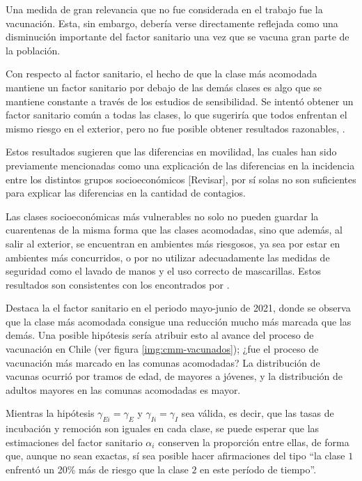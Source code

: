 Una medida de gran relevancia que no fue considerada en el trabajo fue la vacunación. Esta, sin embargo, debería verse directamente reflejada como una disminución importante del factor sanitario una vez que se vacuna gran parte de la población.

Con respecto al factor sanitario, el hecho de que la clase más acomodada mantiene un factor sanitario por debajo de las demás clases es algo que se mantiene constante a través de los estudios de sensibilidad. Se intentó obtener un factor sanitario común a todas las clases, lo que sugeriría que todos enfrentan el mismo riesgo en el exterior, pero no fue posible obtener resultados razonables, .

Estos resultados sugieren que las diferencias en movilidad, las cuales han sido previamente mencionadas como una explicación de las diferencias en la incidencia entre los distintos grupos socioeconómicos \cite{Mena2021}\cite{Gozzi2021} [Revisar], por sí solas no son suficientes para explicar las diferencias en la cantidad de contagios.

Las clases socioeconómicas más vulnerables no solo no pueden guardar la cuarentenas de la misma forma que las clases acomodadas, sino que además, al salir al exterior, se encuentran en ambientes más riesgosos, ya sea por estar en ambientes más concurridos, o por no utilizar adecuadamente las medidas de seguridad como el lavado de manos y el uso correcto de mascarillas. Estos resultados son consistentes con los encontrados por \cite{Chang2021}.

Destaca la el factor sanitario en el periodo mayo-junio de 2021, donde se observa que la clase más acomodada consigue una reducción mucho más marcada que las demás. Una posible hipótesis sería atribuir esto al avance del proceso de vacunación en Chile (ver figura \ref{img:cmm-vacunados}); ¿fue el proceso de vacunación más marcado en las comunas acomodadas? La distribución de vacunas ocurrió por tramos de edad, de mayores a jóvenes, y la distribución de adultos mayores en las comunas acomodadas es mayor.

Mientras la hipótesis \(\gamma_{Ei} = \gamma_E\) y \(\gamma_{Ii} = \gamma_I\) sea válida, es decir, que las tasas de incubación y remoción son iguales en cada clase, se puede esperar que las estimaciones del factor sanitario \(\alpha_i\) conserven la proporción entre ellas, de forma que, aunque no sean exactas, sí sea posible hacer afirmaciones del tipo ``la clase \(1\) enfrentó un 20\% más de riesgo que la clase \(2\) en este período de tiempo''. 

